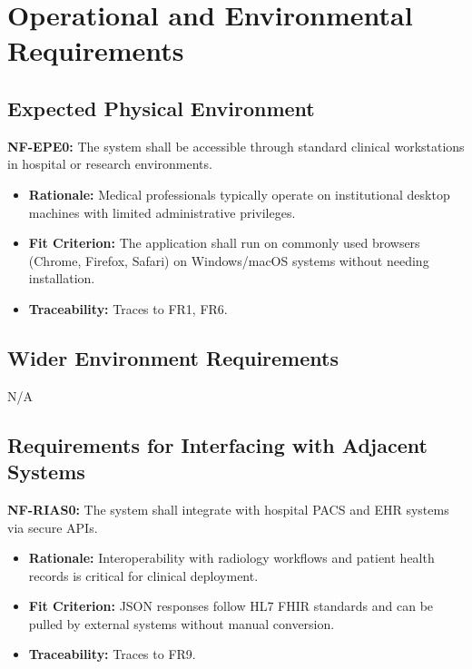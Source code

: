 \documentclass[12pt]{article}
\begin{document}
\section{Operational and Environmental Requirements}


\subsection{Expected Physical Environment}

\textbf{NF-EPE0:} The system shall be accessible through standard clinical workstations in hospital or research environments.
\begin{itemize}
    \item \textbf{Rationale:} Medical professionals typically operate on institutional desktop machines with limited administrative privileges.
    \item \textbf{Fit Criterion:} The application shall run on commonly used browsers (Chrome, Firefox, Safari) on Windows/macOS systems without needing installation.
    \item \textbf{Traceability:} Traces to FR1, FR6.
\end{itemize}


\subsection{Wider Environment Requirements}

N/A

\subsection{Requirements for Interfacing with Adjacent Systems}

\textbf{NF-RIAS0:} The system shall integrate with hospital PACS and EHR systems via secure APIs.
\begin{itemize}
    \item \textbf{Rationale:} Interoperability with radiology workflows and patient health records is critical for clinical deployment.
    \item \textbf{Fit Criterion:} JSON responses follow HL7 FHIR standards\cite{fhir} and can be pulled by external systems without manual conversion.
    \item \textbf{Traceability:} Traces to FR9.
\end{itemize}
\end{document}
